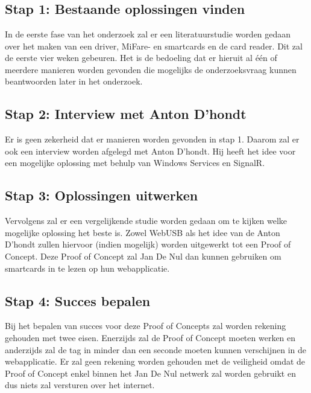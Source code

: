 \graphicspath{{graphics/}}
\chapter{}%
\label{ch:methodologie}

\section{Stap 1: Bestaande oplossingen vinden}
In de eerste fase van het onderzoek zal er een literatuurstudie worden gedaan over het maken van een driver, MiFare- en smartcards en de card reader. Dit zal de eerste vier weken gebeuren. Het is de bedoeling dat er hieruit al één of meerdere manieren worden gevonden die mogelijks de onderzoeksvraag kunnen beantwoorden later in het onderzoek.

\section{Stap 2: Interview met Anton D'hondt}
Er is geen zekerheid dat er manieren worden gevonden in stap 1. Daarom zal er ook een interview worden afgelegd met Anton D'hondt. Hij heeft het idee voor een mogelijke oplossing met behulp van Windows Services en SignalR.

\section{Stap 3: Oplossingen uitwerken}
Vervolgens zal er een vergelijkende studie worden gedaan om te kijken welke mogelijke oplossing het beste is. Zowel WebUSB als het idee van de Anton D'hondt zullen hiervoor (indien mogelijk) worden uitgewerkt tot een Proof of Concept. Deze Proof of Concept zal Jan De Nul dan kunnen gebruiken om smartcards in te lezen op hun webapplicatie.

\section{Stap 4: Succes bepalen}
Bij het bepalen van succes voor deze Proof of Concepts zal worden rekening gehouden met twee eisen. Enerzijds zal de Proof of Concept moeten werken en anderzijds zal de tag in minder dan een seconde moeten kunnen verschijnen in de webapplicatie. Er zal geen rekening worden gehouden met de veiligheid omdat de Proof of Concept enkel binnen het Jan De Nul netwerk zal worden gebruikt en dus niets zal versturen over het internet.


